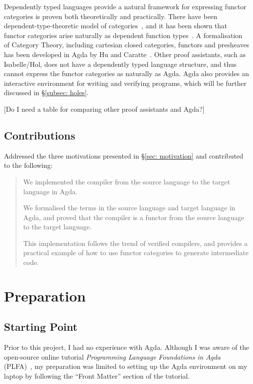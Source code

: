 \documentclass[12pt,twoside,a4paper]{report}
\theoremstyle{definition}
\theoremstyle{definition}
\newcounter{motivation}
\newcommand{\secref}[1]{\S\ref{#1}}
\begin{document}
        Dependently typed languages provide a natural framework for expressing functor categories is proven both theoretically and practically. There have been dependent-type-theoretic model of categories~\cite{Dybjer}, and it has been shown that functor categories arise naturally as dependent function types~\cite{Jacobs}. A formalisation of Category Theory, including cartesian closed categories, functors and presheaves has been developed in Agda by Hu and Caratte~\cite{Cat_Agda}. Other proof assistants, such as Isabelle/Hol, does not have a dependently typed language structure, and thus cannot express the functor categories as naturally as Agda. Agda also provides an interactive environment for writing and verifying programs, which will be further discussed in \secref{subsec: holes}.

        [Do I need a table for comparing other proof assistants and Agda?]


    \section{Contributions}
        Addressed the three motivations presented in \secref{sec: motivation} and contributed to the following:
        \begin{quote}
            \savedmotivationI
            We implemented the compiler from the source language to the target language in Agda. 

            \savedmotivationII
            We formalised the terms in the source language and target language in Agda, and proved that the compiler is a functor from the source language to the target language. 

            \savedmotivationIII
            This implementation follows the trend of verified compilers, and provides a practical example of how to use functor categories to generate intermediate code.
        \end{quote}


\chapter{Preparation}
    \minitoc

    \section{Starting Point}
    Prior to this project, I had no experience with Agda. Although I was aware of the open-source online tutorial \textit{Programming Language Foundations in Agda} (PLFA)~\cite{plfa}, my preparation was limited to setting up the Agda environment on my laptop by following the ``Front Matter'' section of the tutorial.
\end{document}
